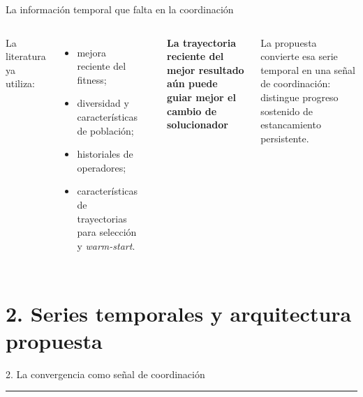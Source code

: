 \documentclass[aspectratio=169,11pt]{beamer}
\newcommand{\smallcite}[1]{{\scriptsize\color{inkgray!72}\parencite{#1}}}
\begin{document}
\begin{frame}{La información temporal que falta en la coordinación}
  \begin{columns}[T,onlytextwidth]
      La literatura ya utiliza:
      \begin{itemize}
        \item mejora reciente del fitness;
        \item diversidad y características de población;
        \item historiales de operadores;
        \item características de trayectorias para selección y \textit{warm-start}.
      \end{itemize}

      \vspace{0.25cm}
      \smallcite{jankovic2022trajectory,kostovska2022per,cenikj2026survey}

      \vspace{0.15cm}
      {\Large\color{PUCVRed}\bfseries La trayectoria reciente del mejor resultado aún puede guiar mejor el cambio de solucionador}

      \vspace{0.5cm}
      La propuesta convierte esa serie temporal en una señal de coordinación: distingue progreso sostenido de estancamiento persistente.
  \end{columns}
\end{frame}

\section{2. Series temporales y arquitectura propuesta}

\begin{frame}[plain]
  \centering
  \vfill
  {\color{primary}2. La convergencia como señal de coordinación}\\[0.6em]
  {\color{accent}\rule{4.2cm}{2.2pt}}
  \vfill
\end{frame}
\end{document}
